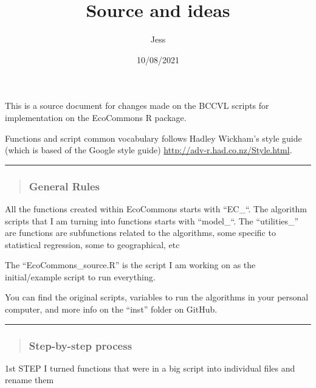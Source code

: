 \documentclass[
]{article}
\title{Source and ideas}
\author{Jess}
\date{10/08/2021}
\begin{document}
\maketitle

This is a source document for changes made on the BCCVL scripts for
implementation on the EcoCommons R package.

Functions and script common vocabulary follows Hadley Wickham's style
guide (which is based of the Google style guide)
\url{http://adv-r.had.co.nz/Style.html}.

\begin{center}\rule{0.5\linewidth}{0.5pt}\end{center}

\begin{quote}
\hypertarget{general-rules}{%
\subsubsection{\texorpdfstring{\textbf{General
Rules}}{General Rules}}\label{general-rules}}
\end{quote}

All the functions created within EcoCommons starts with ``EC\_``. The
algorithm scripts that I am turning into functions starts with
``model\_``. The ``utilities\_'' are functions are subfunctions related
to the algorithms, some specific to statistical regression, some to
geographical, etc

The ``EcoCommons\_source.R'' is the script I am working on as the
initial/example script to run everything.

You can find the original scripts, variables to run the algorithms in
your personal computer, and more info on the ``inst'' folder on GitHub.

\begin{center}\rule{0.5\linewidth}{0.5pt}\end{center}

\begin{quote}
\hypertarget{step-by-step-process}{%
\subsubsection{\texorpdfstring{\textbf{Step-by-step
process}}{Step-by-step process}}\label{step-by-step-process}}
\end{quote}

1st STEP I turned functions that were in a big script into individual
files and rename them
\end{document}
